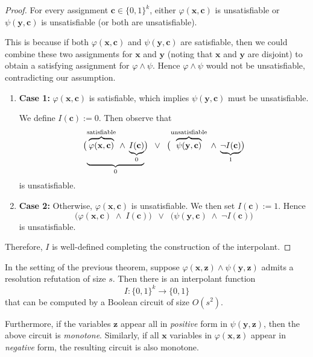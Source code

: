 \begin{proof}
For every assignment \(\mathbf{c} \in \{0,1\}^k\), either \(\varphi(\mathbf{x}, \mathbf{c})\) is unsatisfiable or \(\psi(\mathbf{y}, \mathbf{c})\) is unsatisfiable (or both are unsatisfiable). 

 
 
This is because if both \(\varphi(\mathbf{x},\mathbf{c})\) and \(\psi(\mathbf{y},\mathbf{c})\) are satisfiable, then we could combine these two assignments for \(\mathbf{x}\) and \(\mathbf{y}\) (noting that \(\mathbf{x}\) and \(\mathbf{y}\) are disjoint) to obtain a satisfying assignment for \(\varphi \wedge \psi\). Hence \(\varphi \wedge \psi\) would not be unsatisfiable, contradicting our assumption.

\begin{enumerate}[label=\textbf{(\alph*)}]
    \item \textbf{Case 1:} \(\varphi(\mathbf{x},\mathbf{c})\) is satisfiable, which implies \(\psi(\mathbf{y},\mathbf{c})\) must be unsatisfiable. 

    We define \( I(\mathbf{c}) := 0\). Then observe that
    \[
      \bigl(\underbrace{\overbrace{\varphi(\mathbf{x},\mathbf{c})}^{\rm satisfiable} \;\land\; \underbrace{I(\mathbf{c})}_{0}}_0\bigr)
      \;\;\lor\;\;
      \bigl(\overbrace{\psi(\mathbf{y},\mathbf{c}) }^{\rm unsatisfiable}\;\land\;\underbrace{\neg I(\mathbf{c})}_1\bigr)
    \]
    is unsatisfiable. 

    \item \textbf{Case 2:} Otherwise, \(\varphi(\mathbf{x},\mathbf{c})\) is unsatisfiable. We then set \(I(\mathbf{c}) := 1\). Hence
    \[
      \bigl(\varphi(\mathbf{x},\mathbf{c}) \;\land\; I(\mathbf{c})\bigr)
      \;\;\lor\;\;
      \bigl(\psi(\mathbf{y},\mathbf{c}) \;\land\;\neg I(\mathbf{c})\bigr)
    \]
    is unsatisfiable.

\end{enumerate}

\noindent
Therefore, \(I\) is well-defined completing the construction of the interpolant.

\end{proof}


\begin{theorem}
\label{thm:interpolation-circuit}
In the setting of the previous theorem, suppose 
\(\varphi(\mathbf{x},\mathbf{z}) \wedge \psi(\mathbf{y},\mathbf{z})\) 
admits a resolution refutation of size \(s\). Then there is an interpolant function 
\[
I \colon \{0,1\}^k \to \{0,1\}
\]
that can be computed by a Boolean circuit of size \(O(s^2)\).

Furthermore, if the variables \(\mathbf{z}\) appear all in \emph{positive} form in 
\(\psi(\mathbf{y},\mathbf{z})\), then the above circuit is \emph{monotone}. 
Similarly, if all \(\mathbf{x}\) variables in \(\varphi(\mathbf{x},\mathbf{z})\) 
appear in \emph{negative} form, the resulting circuit is also monotone.
\end{theorem}

